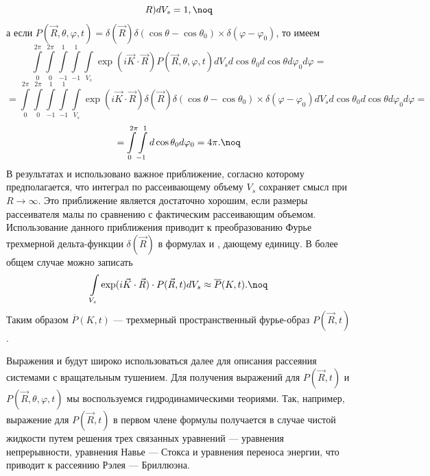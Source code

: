 {$$R)dV_s=1,\noq$$
а если $P(\vec R,\theta,\varphi,t)=\delta(\vec
R)\delta(\cos\theta-\cos\theta_0)\times\delta(\varphi-\varphi_0)$,
то имеем
$$\int\limits_{0}^{2\pi}\int\limits_{0}^{2\pi}\int\limits_{-1}^{1}\int
\limits_{-1}^{1}\int\limits_{V_s}\exp(i\vec K\cdot\vec R)P(\vec
R,\theta,\varphi,t)dV_sd\cos\theta_0d\cos\theta
d\varphi_0d\varphi=$$
$$=\int\limits_{0}^{2\pi}\int\limits_{0}^{2\pi}\int\limits_{-1}^{1}\int
\limits_{-1}^{1}\int\limits_{V_s}\exp(i\vec K\cdot\vec
R)\delta(\vec
R)\delta(\cos\theta-\cos\theta_0)\times\delta(\varphi-\varphi_0)dV_s
d\cos\theta_0 d\cos\theta
d\varphi_0d\varphi=$$$$=\int\limits_{0}^{2\pi}
\int\limits_{-1}^{1}d\cos\theta_{0}d\varphi_0=4\pi.\noq$$
В результатах  и  использовано важное приближение, согласно
которому предполагается, что интеграл по рассеивающему объему
$V_s$ сохраняет смысл при $R\rightarrow\infty$. Это приближение
является достаточно хорошим, если размеры рассеивателя малы по
сравнению с фактическим рассеивающим объемом.
Использование данного приближения приводит к преобразованию Фурье трехмерной
дельта-функции $\delta(\vec R)$ в формулах  и ,
дающему единицу. В более общем случае можно записать
$$\int\limits_{V_s}\exp(i\vec K\cdot\vec R)\cdot P(\vec
R,t)dV_s\approx \overline{P}(K,t).\noq$$
Таким образом $\overline{P}(K,t)$ --- трехмерный пространственный фурье-образ
$P(\vec R,t)$.

Выражения  и  будут широко использоваться далее
для описания рассеяния системами с вращательным тушением.
Для получения выражений для $P(\vec R,t)$ и
$P(\vec R,\theta,\varphi,t)$ мы воспользуемся гидродинамическими
теориями. Так, например, выражение для $P(\vec R,t)$ в первом
члене формулы  получается в случае чистой жидкости путем
решения трех связанных уравнений --- уравнения непрерывности,
уравнения Навье --- Стокса и уравнения переноса энергии, что
приводит к рассеянию Рэлея --- Бриллюэна.


}
